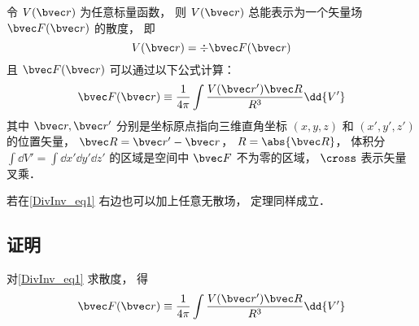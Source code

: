 
\begin{theorem}{}
令 $V(\bvec r)$ 为任意标量函数， 则 $V(\bvec r)$ 总能表示为一个矢量场 $\bvec F(\bvec r)$ 的散度， 即
\begin{equation}
V(\bvec r) = \div \bvec F(\bvec r)
\end{equation}
且 $\bvec F(\bvec r)$ 可以通过以下公式计算：
\begin{equation}\label{DivInv_eq1}
\bvec F(\bvec r) \equiv \frac{1}{4\pi}\int \frac{V(\bvec r') \bvec R}{R^3} \dd{V'}
\end{equation}
其中 $\bvec r, \bvec r'$ 分别是坐标原点指向三维直角坐标 $(x, y, z)$ 和 $(x', y', z')$ 的位置矢量， $\bvec R = \bvec r' - \bvec r$， $R = \abs{\bvec R}$， 体积分 $\int\dd{V'} = \int\dd{x'}\dd{y'}\dd{z'}$ 的区域是空间中 $\bvec F$ 不为零的区域， $\cross$ 表示矢量叉乘．

若在\autoref{DivInv_eq1} 右边也可以加上任意无散场， 定理同样成立．
\end{theorem}

\subsection{证明}
对\autoref{DivInv_eq1} 求散度， 得
\begin{equation}
\bvec F(\bvec r) \equiv \frac{1}{4\pi}\int \frac{V(\bvec r') \bvec R}{R^3} \dd{V'}
\end{equation}
